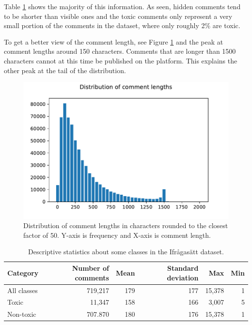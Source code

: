 \documentclass[nofilelist]{cslthse-msc}
\begin{document}
Table \ref{tab:deskriptiv} shows the majority of this information. As seen, hidden comments tend to be shorter than visible ones and the toxic comments only represent a very small portion of the comments in the dataset, where only roughly 2$\%$ are toxic. 

To get a better view of the comment length, see Figure \ref{fig:distribution} and the peak at comment lengths around 150 characters. Comments that are longer than 1500 characters cannot at this time be published on the platform. This explains the other peak at the tail of the distribution.

\begin{figure}[t]
    \centering
    \includegraphics{langddistribution.pdf}
    \caption{Distribution of comment lengths in characters rounded to the closest factor of 50. Y-axis is frequency and X-axis is comment length.}
    \label{fig:distribution}
\end{figure}

\begin{table}[t]
\centering
\begin{tabular}{@{}lrrrrr@{}}
\toprule
Category    & Number of comments & Mean & Standard deviation & Max   & Min \\ \midrule
All classes & 719,217 & 179  & 177                & 15,378 & 1   \\
Toxic       & 11,347 & 158  & 166                & 3,007  & 5   \\ 
Non-toxic   & 707.870 & 180 & 176 & 15,378 & 1 \\\bottomrule
\end{tabular}
\caption{Descriptive statistics about some classes in the Ifrågasätt dataset.}
\label{tab:deskriptiv}
\end{table}
\end{document}
